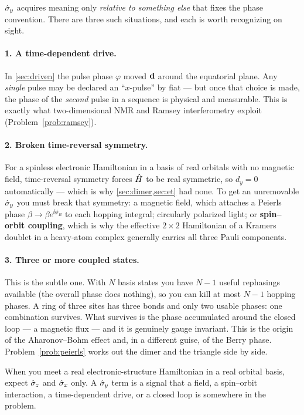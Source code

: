 $\hat{\sigma}_y$ acquires meaning only \emph{relative to something else} that fixes the phase
convention. There are three such situations, and each is worth recognizing on sight.

\paragraph{1. A time-dependent drive.} In \cref{sec:driven} the pulse phase $\varphi$
moved $\mathbf{d}$ around the equatorial plane. Any \emph{single} pulse may be declared an
``$x$-pulse'' by fiat --- but once that choice is made, the phase of the \emph{second}
pulse in a sequence is physical and measurable. This is exactly what two-dimensional NMR
and Ramsey interferometry exploit (Problem~\ref{prob:ramsey}).

\paragraph{2. Broken time-reversal symmetry.} For a spinless electronic Hamiltonian in a
basis of real orbitals with no magnetic field, time-reversal symmetry forces $\hat{H}$ to be
real symmetric, so $d_y=0$ automatically --- which is why \cref{sec:dimer,sec:et} had
none. To get an unremovable $\hat{\sigma}_y$ you must break that symmetry: a magnetic field, which
attaches a Peierls phase $\beta\to\beta e^{\ii\phi_B}$ to each hopping integral;
circularly polarized light; or \textbf{spin--orbit coupling}, which is why the effective
$2\times2$ Hamiltonian of a Kramers doublet in a heavy-atom complex generally carries all
three Pauli components.

\paragraph{3. Three or more coupled states.} This is the subtle one. With $N$ basis states
you have $N-1$ useful rephasings available (the overall phase does nothing), so you can
kill at most $N-1$ hopping phases. A ring of three sites has three bonds and only two
usable phases: one combination survives. What survives is the phase accumulated around
the closed loop --- a magnetic flux --- and it is genuinely gauge invariant. This is the
origin of the Aharonov--Bohm effect and, in a different guise, of the Berry phase.
Problem~\ref{prob:peierls} works out the dimer and the triangle side by side.

\begin{nbbox}
When you meet a real electronic-structure Hamiltonian in a real orbital basis, expect
$\hat{\sigma}_z$ and $\hat{\sigma}_x$ only. A $\hat{\sigma}_y$ term is a signal that a field, a spin--orbit
interaction, a time-dependent drive, or a closed loop is somewhere in the problem.
\end{nbbox}
